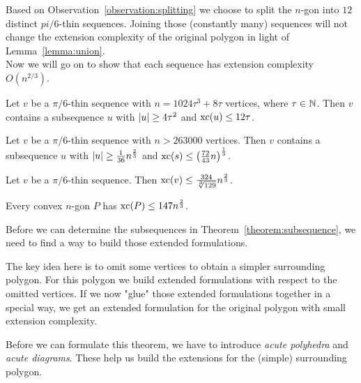 Based on Observation~\ref{observation:splitting} we choose to split the $n$-gon into $12$ distinct $pi/6$-thin sequences. Joining those (constantly many) sequences will not change the extension complexity of the original polygon in light of Lemma~\ref{lemma:union}. \\
Now we will go on to show that each sequence has extension complexity $O(n^{2/3})$.

\begin{theorem}\label{theorem:subsequence}
  Let $v$ be a $\pi/6$-thin sequence with $n = 1024\tau^3 + 8\tau$ vertices, where $\tau \in \mathbb{N}$. 
  Then $v$ contains a subsequence $u$ with $\lvert u\rvert \geq 4\tau^2$ and $\operatorname{xc}(u) \leq 12\tau$.
\end{theorem}

\begin{corollary}\label{corollary:subsequence}
  Let $v$ be a $\pi/6$-thin sequence with $n > 263 000$ vertices. 
  Then $v$ contains a subsequence $u$ with $\lvert u\rvert \geq \frac{1}{36} n^{\frac{2}{3}}$ and $\operatorname{xc}(s) \leq \left( \frac{72}{43}n \right)^{\frac{1}{3}}$.
\end{corollary}

\begin{corollary}\label{corollary:thin-xc}
  Let $v$ be a $\pi/6$-thin sequence. Then $\operatorname{xc}(v) \leq \frac{324}{\sqrt[3]{129}} n^{\frac{2}{3}}$.
\end{corollary}

\begin{theorem}\label{theorem:xc}
  Every convex $n$-gon $P$ has $\operatorname{xc}(P) \leq 147 n^{\frac{2}{3}}$.
\end{theorem}

Before we can determine the subsequences in Theorem~\ref{theorem:subsequence}, we need to find a way to build those extended formulations.

The key idea here is to omit some vertices to obtain a simpler surrounding polygon. For this polygon we build extended formulations with respect to the omitted vertices. If we now "glue" those extended formulations together in a special way, we get an extended formulation for the original polygon with small extension complexity.

Before we can formulate this theorem, we have to introduce \emph{acute polyhedra} and \emph{acute diagrams}. These help us build the extensions for the (simple) surrounding polygon.

